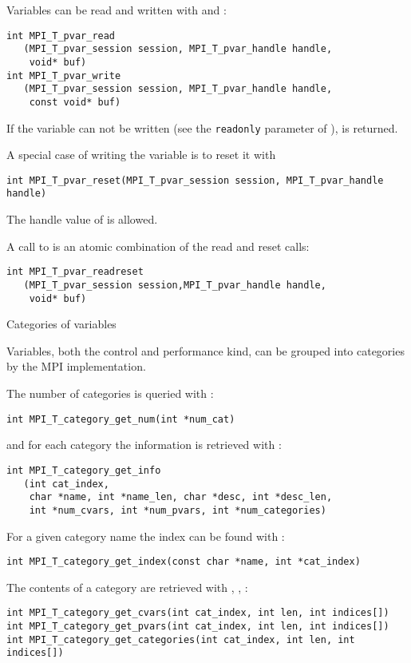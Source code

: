 \begin{mpifour}
Variables can be read and written with
 and :
\begin{lstlisting}
int MPI_T_pvar_read
   (MPI_T_pvar_session session, MPI_T_pvar_handle handle,
    void* buf)
int MPI_T_pvar_write
   (MPI_T_pvar_session session, MPI_T_pvar_handle handle,
    const void* buf)
\end{lstlisting}
If the variable can not be written
(see the \lstinline{readonly} parameter of ),
  is returned.

A special case of writing the variable is to reset it with
\begin{lstlisting}
int MPI_T_pvar_reset(MPI_T_pvar_session session, MPI_T_pvar_handle handle)  
\end{lstlisting}
The handle value of  is allowed.

A call to 
is an atomic combination of the read and reset calls:
\begin{lstlisting}
int MPI_T_pvar_readreset
   (MPI_T_pvar_session session,MPI_T_pvar_handle handle, 
    void* buf)
\end{lstlisting}

 {Categories of variables}

Variables, both the control and performance kind,
can be grouped into categories by the MPI implementation.

The number of categories is queried with
:
\begin{lstlisting}
int MPI_T_category_get_num(int *num_cat)
\end{lstlisting}
and for each category the information is retrieved with
:
\begin{lstlisting}
int MPI_T_category_get_info
   (int cat_index,
    char *name, int *name_len, char *desc, int *desc_len, 
    int *num_cvars, int *num_pvars, int *num_categories)
\end{lstlisting}
For a given category name the index can be found with
:
\begin{lstlisting}
int MPI_T_category_get_index(const char *name, int *cat_index)
\end{lstlisting}

The contents of a category are retrieved with
,
,
:
\begin{lstlisting}
int MPI_T_category_get_cvars(int cat_index, int len, int indices[])
int MPI_T_category_get_pvars(int cat_index, int len, int indices[])
int MPI_T_category_get_categories(int cat_index, int len, int indices[])
\end{lstlisting}


\end{mpifour}
